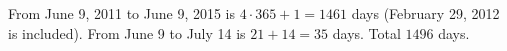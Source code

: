 From June 9, 2011 to June 9, 2015 is $4\cdot365+1=1461$ days (February 29, 2012 is included). From June 9 to July 14 is $21+14=35$ days. Total $\boxed{1496}$ days.
